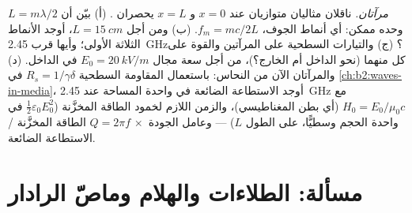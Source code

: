 \begin{exercise}[$\star\star\star$]\label{exo:b2:wave-interfaces:12}
\emph{مرآتان.} ناقلان مثاليان متوازيان عند $x = 0$ و $x =
L$ يحصران . (أ) بيّن أن $L = m\lambda/2$ وحده ممكن:
أي أنماط الجوف، $f_m = mc/2L$. (ب) ومن أجل $L = \qty{15}{cm}$، أوجد الأنماط الثلاثة
الأولى؛ وأيها قرب \qty{2.45}{GHz}؟ (ج) والتيارات السطحية على
المرآتين والقوة على كل منهما (نحو الداخل أم الخارج؟)، من أجل سعة مجال
$E_0 = \qty{20}{kV/m}$ في الداخل. (د) والمرآتان الآن من النحاس:
باستعمال المقاومة السطحية $R_s = 1/\gamma\delta$ في
\cref{ch:b2:waves-in-media}، أوجد الاستطاعة الضائعة في واحدة المساحة عند
\qty{2.45}{GHz} مع $H_0 = E_0/\mu_0c$ (أي بطن المغناطيسي)، والزمن اللازم لخمود الطاقة المخزَّنة
($\tfrac12\varepsilon_0E_0^2$ في واحدة الحجم وسطيًّا، على الطول $L$)
--- وعامل الجودة $Q = 2\pi f\,\times$ الطاقة المخزَّنة / الاستطاعة الضائعة.
\end{exercise}

\section{مسألة: الطلاءات والهلام وماصّ الرادار}

